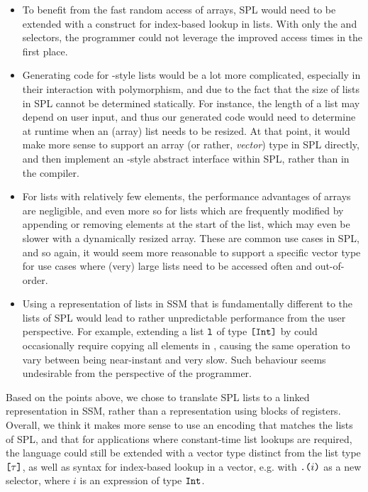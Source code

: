 \begin{itemize}
  \item To benefit from the fast random access of arrays, SPL would need to be
        extended with a construct for index-based lookup in lists. With only the
         and  selectors, the programmer could not leverage the
        improved access times in the first place.
  \item Generating code for -style lists would be a lot more
        complicated, especially in their interaction with polymorphism, and due
        to the fact that the size of lists in SPL cannot be determined
        statically. For instance, the length of a list may depend on user input,
        and thus our generated code would need to determine at runtime when an
        (array) list needs to be resized. At that point, it would make more
        sense to support an array (or rather, \emph{vector}) type in SPL
        directly, and then implement an -style abstract
        interface within SPL, rather than in the compiler.
  \item For lists with relatively few elements, the performance advantages of
        arrays are negligible, and even more so for lists which are frequently
        modified by appending or removing elements at the start of the list,
        which may even be slower with a dynamically resized array.
        These are common use cases in SPL, and so again, it would seem more
        reasonable to support a specific vector type for use cases where (very)
        large lists need to be accessed often and out-of-order.
  \item Using a representation of lists in SSM that is fundamentally different
        to the lists of SPL would lead to rather unpredictable performance from
        the user perspective. For example, extending a list
        $\texttt{l}$ of type $\texttt{[}\texttt{Int}\texttt{]}$ by  could occasionally
        require copying all elements in , causing the same operation to
        vary between being near-instant and very slow. Such behaviour seems
        undesirable from the perspective of the programmer.
\end{itemize}

Based on the points above, we chose to translate SPL lists to a linked
representation in SSM, rather than a representation using blocks of registers.
Overall, we think it makes more sense to use an encoding that matches the lists
of SPL, and that for applications where constant-time list lookups are required,
the language could still be extended with a vector type distinct from the list
type $\texttt{[}\tau\texttt{]}$, as well as syntax for index-based lookup in a vector, e.g.
with $\texttt{.(}i\texttt{)}$ as a new selector, where $i$ is an expression of type
$\texttt{Int}$.


